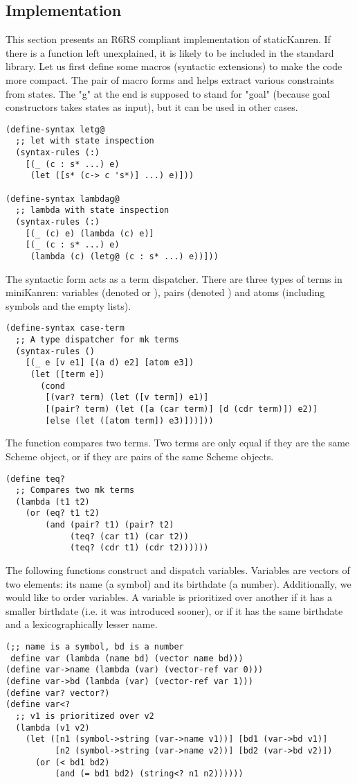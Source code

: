 \subsection{Implementation}
This section presents an R6RS compliant implementation of staticKanren. If there is a function left unexplained, it is likely to be included in the standard library.
Let us first define some macros (syntactic extensions) to make the code more compact. The pair of macro forms  and  helps extract various constraints from states. The "g" at the end is supposed to stand for "goal" (because goal constructors takes states as input), but it can be used in other cases.
\begin{lstlisting}
(define-syntax letg@
  ;; let with state inspection
  (syntax-rules (:)
    [(_ (c : s* ...) e)
     (let ([s* (c-> c 's*)] ...) e)]))

(define-syntax lambdag@
  ;; lambda with state inspection
  (syntax-rules (:)
    [(_ (c) e) (lambda (c) e)]
    [(_ (c : s* ...) e)
     (lambda (c) (letg@ (c : s* ...) e))]))
\end{lstlisting}

The syntactic form  acts as a term dispatcher. There are three types of terms in miniKanren: variables (denoted  or ), pairs (denoted ) and atoms (including symbols and the empty lists).
\begin{lstlisting}
(define-syntax case-term
  ;; A type dispatcher for mk terms
  (syntax-rules ()
    [(_ e [v e1] [(a d) e2] [atom e3])
     (let ([term e])
       (cond
        [(var? term) (let ([v term]) e1)]
        [(pair? term) (let ([a (car term)] [d (cdr term)]) e2)]
        [else (let ([atom term]) e3)]))]))
\end{lstlisting}

The function  compares two terms. Two terms are only equal if they are the same Scheme object, or if they are pairs of the same Scheme objects.
\begin{lstlisting}
(define teq?
  ;; Compares two mk terms
  (lambda (t1 t2)
    (or (eq? t1 t2)
        (and (pair? t1) (pair? t2)
             (teq? (car t1) (car t2))
             (teq? (cdr t1) (cdr t2))))))
\end{lstlisting}

The following functions construct and dispatch variables. Variables are vectors of two elements: its name (a symbol) and its birthdate (a number). Additionally, we would like to order variables. A variable is prioritized over another if it has a smaller birthdate (i.e. it was introduced sooner), or if it has the same birthdate and a lexicographically lesser name.
\begin{lstlisting}
(;; name is a symbol, bd is a number
 define var (lambda (name bd) (vector name bd)))
(define var->name (lambda (var) (vector-ref var 0)))
(define var->bd (lambda (var) (vector-ref var 1)))
(define var? vector?)
(define var<?
  ;; v1 is prioritized over v2
  (lambda (v1 v2)
    (let ([n1 (symbol->string (var->name v1))] [bd1 (var->bd v1)]
          [n2 (symbol->string (var->name v2))] [bd2 (var->bd v2)])
      (or (< bd1 bd2)
          (and (= bd1 bd2) (string<? n1 n2))))))
\end{lstlisting}


